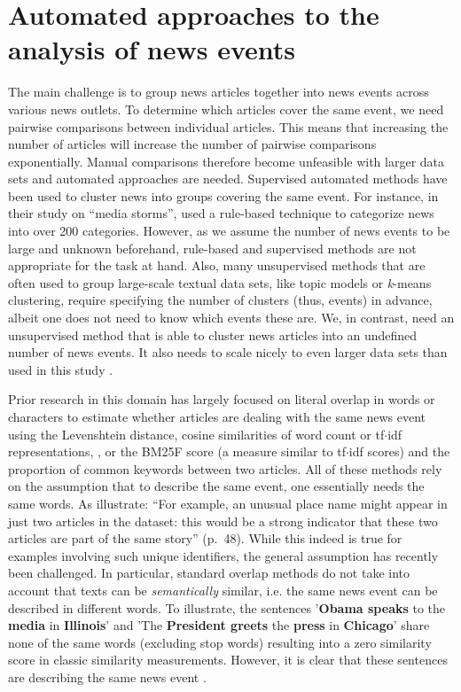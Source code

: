 \documentclass[a4paper,man,natbib,floatsintext,mask]{apa6}
\begin{document}
\section{Automated approaches to the analysis of news events}

The main challenge is to group news articles together into news events across various news outlets. To determine which articles cover the same event, we need pairwise comparisons between individual articles. This means that increasing the number of articles will increase the number of pairwise comparisons exponentially. Manual comparisons therefore become unfeasible with larger data sets and automated approaches are needed. Supervised automated methods have been used to cluster news into groups covering the same event. For instance, in their study on ``media storms'', \cite{boydstun2014two} used a rule-based technique to categorize news into over 200 categories. However, as we assume the number of news events to be large and unknown beforehand, rule-based and supervised methods are not appropriate for the task at hand. Also, many unsupervised methods that are often used to group large-scale textual data sets, like topic models or \textit{k}-means clustering, require specifying the number of clusters (thus, events) in advance, albeit one does not need to know which events these are. We, in contrast, need  an unsupervised method that is able to cluster news articles into an undefined number of news events. It also needs to scale nicely to even larger data sets than used in this study \citep[see also][]{Nicholls2018}.

Prior research in this domain has largely focused on literal overlap in words or characters to estimate whether articles are dealing with the same news event using the Levenshtein distance, cosine similarities of word count or tf$\cdot$idf representations, \citep{Boumans2018, Welbers2016}, or the BM25F score (a measure similar to tf$\cdot$idf scores) and the proportion of common keywords \citep{Nicholls2018} between two articles.
All of these methods rely on the assumption that to describe the same event, one essentially needs the same words. As \cite{Nicholls2018} illustrate: ``For example, an unusual place name might appear in just two articles in the dataset: this would be a strong indicator that these two articles are part of the same story'' (p.~48).
While this indeed is true for examples involving such unique identifiers, the general assumption has recently been challenged. In particular, standard overlap methods do not take into account that texts can be \emph{semantically} similar, i.e. the same news event can be described in different words. To illustrate, the sentences '\textbf{Obama speaks} to the \textbf{media} in \textbf{Illinois}' and 'The \textbf{President greets} the \textbf{press} in \textbf{Chicago}' share none of the same words (excluding stop words) resulting into a zero similarity score in classic similarity measurements. However, it is clear that these sentences are describing the same news event \citep{Kusner2015}. 
\end{document}
